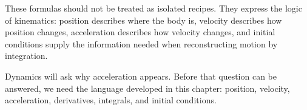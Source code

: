 These formulas should not be treated as isolated recipes. They express the logic of kinematics: position describes where the body is, velocity describes how position changes, acceleration describes how velocity changes, and initial conditions supply the information needed when reconstructing motion by integration.

Dynamics will ask why acceleration appears. Before that question can be answered, we need the language developed in this chapter: position, velocity, acceleration, derivatives, integrals, and initial conditions.
